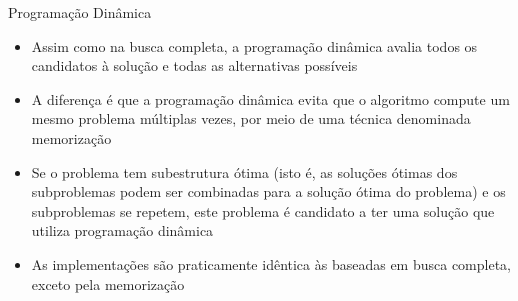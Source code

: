 \begin{frame}[fragile]{Programação Dinâmica}

    \begin{itemize}
        \item Assim como na busca completa, a programação dinâmica avalia todos os candidatos à
            solução e todas as alternativas possíveis

        \item A diferença é que a programação dinâmica evita que o algoritmo compute um mesmo
            problema múltiplas vezes, por meio de uma técnica denominada memorização

        \item Se o problema tem subestrutura ótima (isto é, as soluções ótimas dos subproblemas
            podem ser combinadas para a solução ótima do problema) e os subproblemas se repetem,
            este problema é candidato a ter uma solução que utiliza programação dinâmica

        \item As implementações são praticamente idêntica às baseadas em busca completa, exceto
            pela memorização
            
    \end{itemize}

\end{frame}
